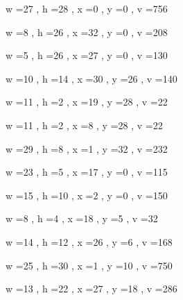 \documentclass[11pt]{article}
\begin{document}
w =27 , h =28 , x =0 , y =0 , v =756
\par
w =8 , h =26 , x =32 , y =0 , v =208
\par
w =5 , h =26 , x =27 , y =0 , v =130
\par
w =10 , h =14 , x =30 , y =26 , v =140
\par
w =11 , h =2 , x =19 , y =28 , v =22
\par
w =11 , h =2 , x =8 , y =28 , v =22
\par
w =29 , h =8 , x =1 , y =32 , v =232
\par
\newpage




w =23 , h =5 , x =17 , y =0 , v =115
\par
w =15 , h =10 , x =2 , y =0 , v =150
\par
w =8 , h =4 , x =18 , y =5 , v =32
\par
w =14 , h =12 , x =26 , y =6 , v =168
\par
w =25 , h =30 , x =1 , y =10 , v =750
\par
w =13 , h =22 , x =27 , y =18 , v =286
\par
\newpage
\end{document}
